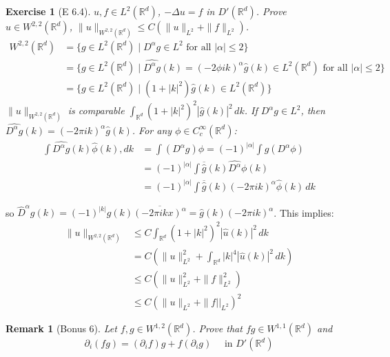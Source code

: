 \documentclass{report}
\theoremstyle{tommy}
\newtheorem{rem}[defn]{Remark}
\newtheorem{ex}[defn]{Exercise}
\begin{document}
  \begin{ex}[E 6.4]
    \(u, f \in L^2(\mathbb{R}^d)\), \(-\Delta u = f \) in \(D'(\mathbb{R}^d)\). Prove \(u \in W^{2,2}(\mathbb{R}^d)\), \(\|u\|_{W^{2,2}(\mathbb{R}^d)} \le C \left(\|u\|_{L^2} + \|f\|_{L^2}\right)\).
    \begin{align*}
      W^{2,2}(\mathbb{R}^d)
      &= \{g \in L^2(\mathbb{R}^d) \mid D^\alpha g \in L^2 \text{ for all } |\alpha| \le 2\} \\
      &= \{g \in L^2(\mathbb{R}^d) \mid \widehat{D^\alpha g}(k) = (-2 \phi ik)^\alpha \hat g(k) \in L^2(\mathbb{R}^d) \text{ for all } |\alpha| \le 2\} \\
      &= \{g \in L^2(\mathbb{R}^d) \mid (1 + |k|^2) \hat g (k) \in L^2(\mathbb{R}^d)\}
    \end{align*}
    \(\|u\|_{W^{2,2}(\mathbb{R}^d)}\) is comparable \(\int_{\mathbb{R}^d} (1 + |k|^2)^2 |\hat g(k)|^2 \, dk\). If \(D^\alpha g \in L^2\), then \(\widehat{D^\alpha g}(k) = (-2 \pi i k)^\alpha \hat g(k)\). For any \(\phi \in C_c^\infty(\mathbb{R}^d)\): 
    \begin{align*}
      \int \widehat{D^\alpha g} (k) \hat \phi (k) , dk
      &= \int (D^\alpha g) \phi = (-1)^{|\alpha|} \int g (D^\alpha \phi) \\
      &= (-1)^{|\alpha|} \int \overline{\widehat{g}}(k) \widehat{D^\alpha} \phi(k) \\
      &= (-1)^{|\alpha|} \int \overline{\widehat{g}}(k)(-2 \pi i k)^\alpha \hat \phi(k) \, dk
    \end{align*}
  \end{ex}
  so \(\hat D^\alpha g(k) = (-1)^{|k|} \hat g (k) \overline{(-2 \pi i k x)^\alpha} = \hat g(k)(-2 \pi ik)^\alpha\). This implies:
  \begin{align*}
    \|u\|_{W^{2,2}(\mathbb{R}^d)} 
    &\le C \int_{\mathbb{R}^d} (1 + |k|^2)^2 |\hat u(k)|^2 \, dk \\
    &= C \left(\|u\|_{L^2}^2  + \int_{\mathbb{R}^d} |k|^4 |\hat u(k)|^2 \, dk\right) \\
    &\le C \left(\|u\|_{L^2}^2 + \|f\|_{L^2}^2\right) \\
    &\le C(\| u\|_{L^2} + \|f||_{L^2})^2
  \end{align*}

  \begin{rem}[Bonus 6]
    Let \(f,g \in W^{1,2}(\mathbb{R}^d)\). Prove that \(fg \in W^{1,1}(\mathbb{R}^d)\) and 
    \[\partial_i (fg) = (\partial_i f) g + f(\partial_i g) \quad \text{ in } D'(\mathbb{R}^d)\]
  \end{rem}
\end{document}
